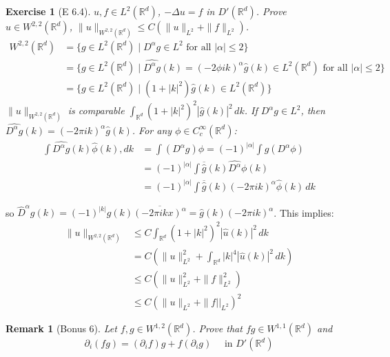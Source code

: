 \documentclass{report}
\theoremstyle{tommy}
\newtheorem{rem}[defn]{Remark}
\newtheorem{ex}[defn]{Exercise}
\begin{document}
  \begin{ex}[E 6.4]
    \(u, f \in L^2(\mathbb{R}^d)\), \(-\Delta u = f \) in \(D'(\mathbb{R}^d)\). Prove \(u \in W^{2,2}(\mathbb{R}^d)\), \(\|u\|_{W^{2,2}(\mathbb{R}^d)} \le C \left(\|u\|_{L^2} + \|f\|_{L^2}\right)\).
    \begin{align*}
      W^{2,2}(\mathbb{R}^d)
      &= \{g \in L^2(\mathbb{R}^d) \mid D^\alpha g \in L^2 \text{ for all } |\alpha| \le 2\} \\
      &= \{g \in L^2(\mathbb{R}^d) \mid \widehat{D^\alpha g}(k) = (-2 \phi ik)^\alpha \hat g(k) \in L^2(\mathbb{R}^d) \text{ for all } |\alpha| \le 2\} \\
      &= \{g \in L^2(\mathbb{R}^d) \mid (1 + |k|^2) \hat g (k) \in L^2(\mathbb{R}^d)\}
    \end{align*}
    \(\|u\|_{W^{2,2}(\mathbb{R}^d)}\) is comparable \(\int_{\mathbb{R}^d} (1 + |k|^2)^2 |\hat g(k)|^2 \, dk\). If \(D^\alpha g \in L^2\), then \(\widehat{D^\alpha g}(k) = (-2 \pi i k)^\alpha \hat g(k)\). For any \(\phi \in C_c^\infty(\mathbb{R}^d)\): 
    \begin{align*}
      \int \widehat{D^\alpha g} (k) \hat \phi (k) , dk
      &= \int (D^\alpha g) \phi = (-1)^{|\alpha|} \int g (D^\alpha \phi) \\
      &= (-1)^{|\alpha|} \int \overline{\widehat{g}}(k) \widehat{D^\alpha} \phi(k) \\
      &= (-1)^{|\alpha|} \int \overline{\widehat{g}}(k)(-2 \pi i k)^\alpha \hat \phi(k) \, dk
    \end{align*}
  \end{ex}
  so \(\hat D^\alpha g(k) = (-1)^{|k|} \hat g (k) \overline{(-2 \pi i k x)^\alpha} = \hat g(k)(-2 \pi ik)^\alpha\). This implies:
  \begin{align*}
    \|u\|_{W^{2,2}(\mathbb{R}^d)} 
    &\le C \int_{\mathbb{R}^d} (1 + |k|^2)^2 |\hat u(k)|^2 \, dk \\
    &= C \left(\|u\|_{L^2}^2  + \int_{\mathbb{R}^d} |k|^4 |\hat u(k)|^2 \, dk\right) \\
    &\le C \left(\|u\|_{L^2}^2 + \|f\|_{L^2}^2\right) \\
    &\le C(\| u\|_{L^2} + \|f||_{L^2})^2
  \end{align*}

  \begin{rem}[Bonus 6]
    Let \(f,g \in W^{1,2}(\mathbb{R}^d)\). Prove that \(fg \in W^{1,1}(\mathbb{R}^d)\) and 
    \[\partial_i (fg) = (\partial_i f) g + f(\partial_i g) \quad \text{ in } D'(\mathbb{R}^d)\]
  \end{rem}
\end{document}
